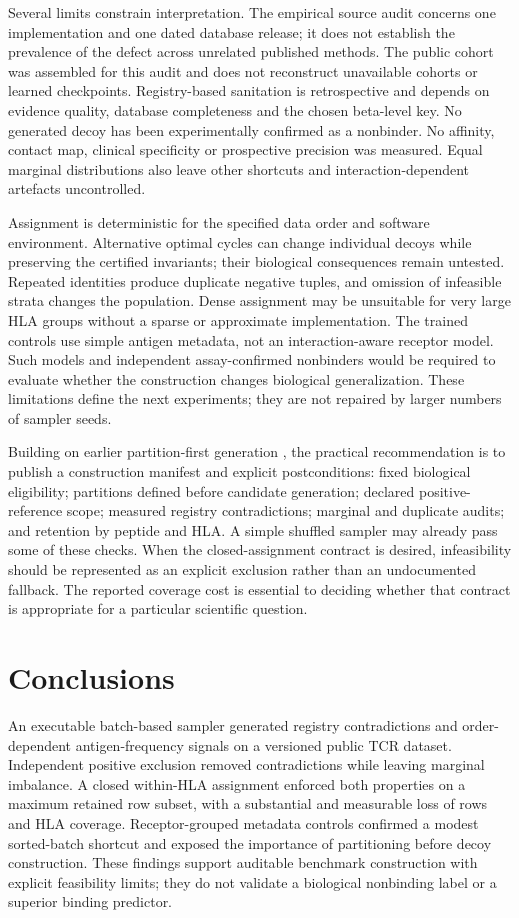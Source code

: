 \documentclass[pdflatex,sn-basic,Numbered]{sn-jnl}
\begin{document}
Several limits constrain interpretation. The empirical source audit concerns one implementation and one dated database release; it does not establish the prevalence of the defect across unrelated published methods. The public cohort was assembled for this audit and does not reconstruct unavailable cohorts or learned checkpoints. Registry-based sanitation is retrospective and depends on evidence quality, database completeness and the chosen beta-level key. No generated decoy has been experimentally confirmed as a nonbinder. No affinity, contact map, clinical specificity or prospective precision was measured. Equal marginal distributions also leave other shortcuts and interaction-dependent artefacts uncontrolled.

Assignment is deterministic for the specified data order and software environment. Alternative optimal cycles can change individual decoys while preserving the certified invariants; their biological consequences remain untested. Repeated identities produce duplicate negative tuples, and omission of infeasible strata changes the population. Dense assignment may be unsuitable for very large HLA groups without a sparse or approximate implementation. The trained controls use simple antigen metadata, not an interaction-aware receptor model. Such models and independent assay-confirmed nonbinders would be required to evaluate whether the construction changes biological generalization. These limitations define the next experiments; they are not repaired by larger numbers of sampler seeds.

Building on earlier partition-first generation \cite{Korpela2023}, the practical recommendation is to publish a construction manifest and explicit postconditions: fixed biological eligibility; partitions defined before candidate generation; declared positive-reference scope; measured registry contradictions; marginal and duplicate audits; and retention by peptide and HLA. A simple shuffled sampler may already pass some of these checks. When the closed-assignment contract is desired, infeasibility should be represented as an explicit exclusion rather than an undocumented fallback. The reported coverage cost is essential to deciding whether that contract is appropriate for a particular scientific question.

\section{Conclusions}
An executable batch-based sampler generated registry contradictions and order-dependent antigen-frequency signals on a versioned public TCR dataset. Independent positive exclusion removed contradictions while leaving marginal imbalance. A closed within-HLA assignment enforced both properties on a maximum retained row subset, with a substantial and measurable loss of rows and HLA coverage. Receptor-grouped metadata controls confirmed a modest sorted-batch shortcut and exposed the importance of partitioning before decoy construction. These findings support auditable benchmark construction with explicit feasibility limits; they do not validate a biological nonbinding label or a superior binding predictor.
\end{document}
